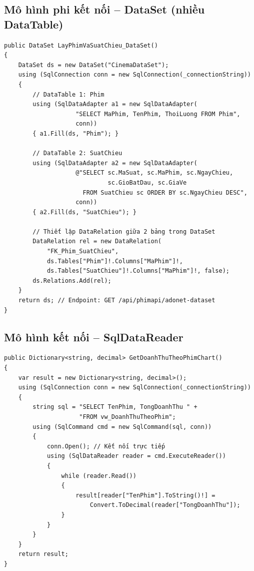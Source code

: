 \documentclass[12pt,a4paper,oneside]{book}
\theoremstyle{plain}
\numberwithin{equation}{chapter}
\begin{document}
\subsection{Mô hình phi kết nối -- DataSet (nhiều DataTable)}\label{sub4.3.2}

\begin{lstlisting}[style=csharpstyle, caption={ADO.NET -- DataSet chứa Phim + SuatChieu + DataRelation}]
public DataSet LayPhimVaSuatChieu_DataSet()
{
    DataSet ds = new DataSet("CinemaDataSet");
    using (SqlConnection conn = new SqlConnection(_connectionString))
    {
        // DataTable 1: Phim
        using (SqlDataAdapter a1 = new SqlDataAdapter(
                    "SELECT MaPhim, TenPhim, ThoiLuong FROM Phim",
                    conn))
        { a1.Fill(ds, "Phim"); }

        // DataTable 2: SuatChieu
        using (SqlDataAdapter a2 = new SqlDataAdapter(
                    @"SELECT sc.MaSuat, sc.MaPhim, sc.NgayChieu,
                             sc.GioBatDau, sc.GiaVe
                      FROM SuatChieu sc ORDER BY sc.NgayChieu DESC",
                    conn))
        { a2.Fill(ds, "SuatChieu"); }

        // Thiết lập DataRelation giữa 2 bảng trong DataSet
        DataRelation rel = new DataRelation(
            "FK_Phim_SuatChieu",
            ds.Tables["Phim"]!.Columns["MaPhim"]!,
            ds.Tables["SuatChieu"]!.Columns["MaPhim"]!, false);
        ds.Relations.Add(rel);
    }
    return ds; // Endpoint: GET /api/phimapi/adonet-dataset
}
\end{lstlisting}

\subsection{Mô hình kết nối -- SqlDataReader}\label{sub4.3.3}

\begin{lstlisting}[style=csharpstyle, caption={ADO.NET -- SqlDataReader (mô hình kết nối, đọc View)}]
public Dictionary<string, decimal> GetDoanhThuTheoPhimChart()
{
    var result = new Dictionary<string, decimal>();
    using (SqlConnection conn = new SqlConnection(_connectionString))
    {
        string sql = "SELECT TenPhim, TongDoanhThu " +
                     "FROM vw_DoanhThuTheoPhim";
        using (SqlCommand cmd = new SqlCommand(sql, conn))
        {
            conn.Open(); // Kết nối trực tiếp
            using (SqlDataReader reader = cmd.ExecuteReader())
            {
                while (reader.Read())
                {
                    result[reader["TenPhim"].ToString()!] = 
                        Convert.ToDecimal(reader["TongDoanhThu"]);
                }
            }
        }
    }
    return result;
}
\end{lstlisting}
\end{document}
